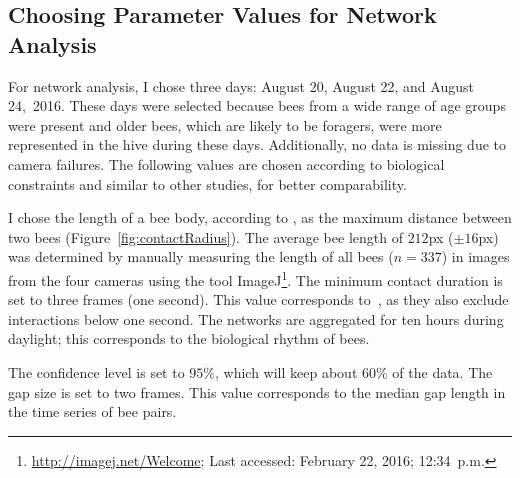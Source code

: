 \subsection{Choosing Parameter Values for Network Analysis}

For network analysis, I chose three days: August 20, August 22, and August 24,~2016.
These days were selected because bees from a wide range of age groups were present and older bees, which are likely to be foragers, were more represented in the hive during these days.
Additionally, no data is missing due to camera failures.
The following values are chosen according to biological constraints and similar to other studies, for better comparability.

I chose the length of a bee body, according to \textcite{baracchi2014socio}, as the maximum distance between two bees (Figure~\ref{fig:contactRadius}).
The average bee length of $212$px ($\pm 16$px)  was determined by manually measuring the length of all bees ($n=337$) in images from the four cameras using the tool ImageJ\footnote{\url{http://imagej.net/Welcome}; Last accessed:
 February 22, 2016; 12:34~p.m.}.
The minimum contact duration is set to three frames (one second). This value corresponds to~\textcite{mersch2013tracking}, as they also exclude interactions below one second.
The networks are aggregated for ten hours during daylight; this corresponds to the biological rhythm of bees.

The confidence level is set to $95\%$, which will keep about 60\% of the data.
The gap size is set to two frames. This value corresponds to the median gap length in the time series of bee pairs.



